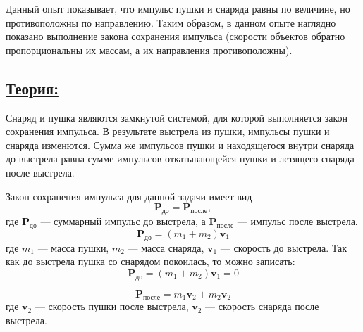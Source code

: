 \documentclass[14pt,a4paper,oneside]{extarticle}	%
\begin{document}
Данный опыт показывает, что импульс пушки и снаряда равны по величине, но противоположны по направлению.
Таким образом, в данном опыте наглядно показано выполнение закона сохранения импульса (скорости объектов обратно пропорциональны их массам, а их направления противоположны).

\newpage
\subsection*{\underline{Теория:}}

Снаряд и пушка являются замкнутой системой, для которой выполняется закон сохранения импульса. 
В результате выстрела из пушки, импульсы пушки и снаряда изменются.
Сумма же импульсов пушки и находящегося внутри снаряда до выстрела равна сумме импульсов откатывающейся пушки и летящего снаряда после выстрела.

Закон сохранения импульса для данной задачи имеет вид 
\begin{equation}\label{cannon-eq1}
 \textbf{P}_{\text{до}} = \textbf{P}_{\text{после}},
\end{equation}
где $ \textbf{P}_{\text{до}} $ — суммарный импульс до выстрела, а $ \textbf{P}_{\text{после}} $ — импульс после выстрела. 
\begin{equation}\label{cannon-eq2}
\textbf{P}_{\text{до}} = (m_{1} + m_{2})\textbf{v}_{1}
\end{equation}
где $ m_{1} $ — масса пушки, $ m_{2} $ — масса снаряда, $ \textbf{v}_{1} $ — скорость до выстрела.
Так как до выстрела пушка со снарядом покоилась, то можно записать: 
\begin{equation}\label{cannon-eq3}
\textbf{P}_{\text{до}} = (m_{1} + m_{2})\textbf{v}_{1} = 0
\end{equation}

\begin{equation}\label{cannon-eq4}
\textbf{P}_{\text{после}} = m_{1}\textbf{v}_{2} + m_{2}\textbf{v}_{2} 
\end{equation}
где $ \textbf{v}_{2} $ — скорость пушки после выстрела, $ \textbf{v}_{2} $ — скорость снаряда после выстрела.
\end{document}
